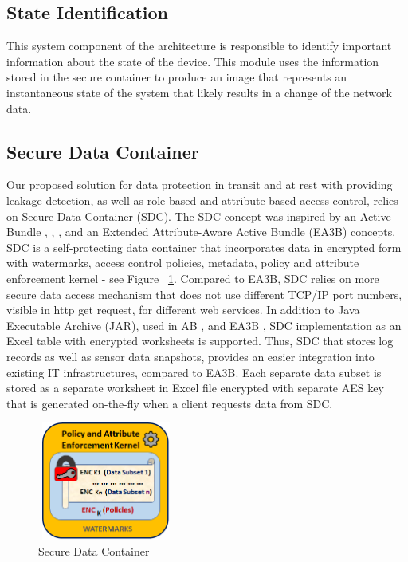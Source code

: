 \documentclass[conference]{IEEEtran}
\begin{document}

\subsection{State Identification}
This system component of the architecture is responsible to identify important information about the state of the device. This module uses the information stored in the secure container to produce an image that represents an instantaneous state of the system that likely results in a change of the network data. 

\subsection{Secure Data Container}
Our proposed solution for data protection in transit and at rest with providing leakage detection, as well as role-based and attribute-based access control, relies on Secure Data Container (SDC). The SDC concept was inspired by an Active Bundle  \cite{c12}, \cite{c13}, \cite{c14}, \cite{c15} and an Extended Attribute-Aware Active Bundle (EA3B) \cite{c6} concepts. SDC is a self-protecting data container that incorporates data in encrypted form with watermarks, access control policies, metadata, policy and attribute enforcement kernel - see Figure ~\ref{sdc}. Compared to EA3B, SDC relies on more secure data access mechanism that does not use different TCP/IP port numbers, visible in http get request, for different web services. In addition to Java Executable Archive (JAR), used in AB \cite{c14}, \cite{c15} and EA3B \cite{c6}, SDC implementation as an Excel table with encrypted worksheets is supported. Thus, SDC that stores log records as well as sensor data snapshots, provides an easier integration into existing IT infrastructures, compared to EA3B. Each separate data subset is stored as a separate worksheet in Excel file encrypted with separate AES key that is generated on-the-fly when a client requests data from SDC. 

\begin{figure}[htbp]
\centering
\centerline{\includegraphics [width=4.5cm, height=3.9cm]
{SDC-Rel.png}}
\caption{Secure Data Container}
\label{sdc}
\end{figure}
\end{document}
